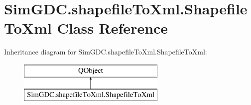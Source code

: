 \hypertarget{class_sim_g_d_c_1_1shapefile_to_xml_1_1_shapefile_to_xml}{}\section{Sim\+G\+D\+C.\+shapefile\+To\+Xml.\+Shapefile\+To\+Xml Class Reference}
\label{class_sim_g_d_c_1_1shapefile_to_xml_1_1_shapefile_to_xml}
Inheritance diagram for Sim\+G\+D\+C.\+shapefile\+To\+Xml.\+Shapefile\+To\+Xml\+:\begin{figure}[H]
\begin{center}
\leavevmode
\includegraphics[height=2.000000cm]{class_sim_g_d_c_1_1shapefile_to_xml_1_1_shapefile_to_xml}
\end{center}
\end{figure}
